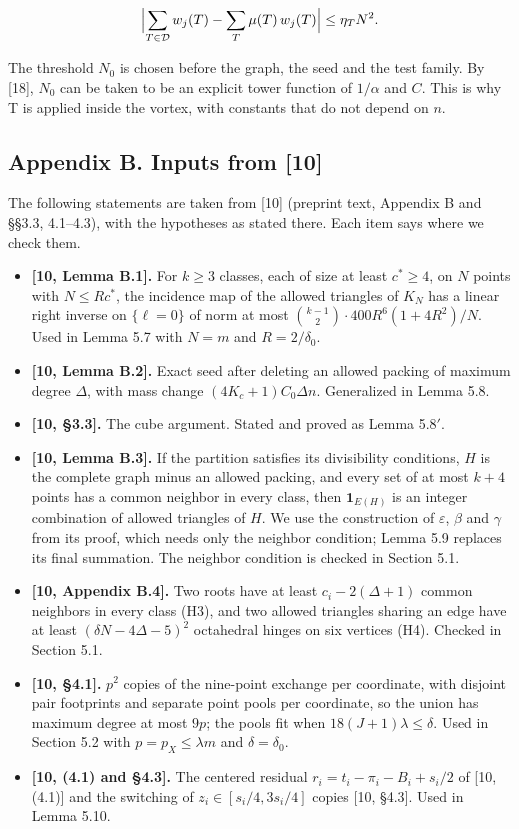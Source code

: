 \documentclass[english,11pt,a4paper]{article}
\providecommand{\tightlist}{\setlength{\itemsep}{0pt}\setlength{\parskip}{0pt}}
\begin{document}
\nopagebreak[4]
\[\Bigl|\sum_{T\in\mathcal D}w_j(T)-\sum_T\mu(T)\,w_j(T)\Bigr|\le\eta_T N^2.\]

The threshold \(N_0\) is chosen before the graph, the seed and the test family. By {[}18{]}, \(N_0\) can be taken to be an explicit tower function of \(1/\alpha\) and \(C\). This is why T is applied inside the vortex, with constants that do not depend on \(n\).

\subsection{Appendix B. Inputs from {[}10{]}}\label{appendix-b.-inputs-from-10}

The following statements are taken from {[}10{]} (preprint text, Appendix B and §§3.3, 4.1--4.3), with the hypotheses as stated there. Each item says where we check them.

\begin{itemize}
\tightlist
\item
  \textbf{{[}10, Lemma B.1{]}.} For \(k\ge3\) classes, each of size at least \(c^*\ge4\), on \(N\) points with \(N\le Rc^*\), the incidence map of the allowed triangles of \(K_N\) has a linear right inverse on \(\{\ell=0\}\) of norm at most \(\binom{k-1}{2}\cdot400R^6(1+4R^2)/N\). Used in Lemma 5.7 with \(N=m\) and \(R=2/\delta_0\).
\item
  \textbf{{[}10, Lemma B.2{]}.} Exact seed after deleting an allowed packing of maximum degree \(\Delta\), with mass change \((4K_c+1)C_0\Delta n\). Generalized in Lemma 5.8.
\item
  \textbf{{[}10, §3.3{]}.} The cube argument. Stated and proved as Lemma 5.8\('\).
\item
  \textbf{{[}10, Lemma B.3{]}.} If the partition satisfies its divisibility conditions, \(H\) is the complete graph minus an allowed packing, and every set of at most \(k+4\) points has a common neighbor in every class, then \(\mathbf 1_{E(H)}\) is an integer combination of allowed triangles of \(H\). We use the construction of \(\varepsilon\), \(\beta\) and \(\gamma\) from its proof, which needs only the neighbor condition; Lemma 5.9 replaces its final summation. The neighbor condition is checked in Section 5.1.
\item
  \textbf{{[}10, Appendix B.4{]}.} Two roots have at least \(c_i-2(\Delta+1)\) common neighbors in every class (H3), and two allowed triangles sharing an edge have at least \((\delta N-4\Delta-5)^2\) octahedral hinges on six vertices (H4). Checked in Section 5.1.
\item
  \textbf{{[}10, §4.1{]}.} \(p^2\) copies of the nine-point exchange per coordinate, with disjoint pair footprints and separate point pools per coordinate, so the union has maximum degree at most \(9p\); the pools fit when \(18(J+1)\lambda\le\delta\). Used in Section 5.2 with \(p=p_X\le\lambda m\) and \(\delta=\delta_0\).
\item
  \textbf{{[}10, (4.1) and §4.3{]}.} The centered residual \(r_i=t_i-\pi_i-B_i+s_i/2\) of {[}10, (4.1){]} and the switching of \(z_i\in[s_i/4,3s_i/4]\) copies {[}10, §4.3{]}. Used in Lemma 5.10.
\end{itemize}
\end{document}
